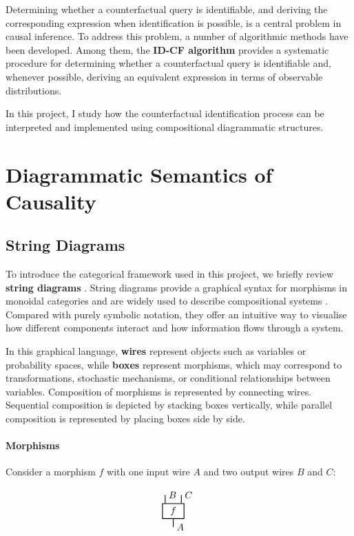\documentclass[a4paper]{report}
\begin{document}
Determining whether a counterfactual query is identifiable, and deriving the corresponding expression when identification is possible, is a central problem in causal inference. To address this problem, a number of algorithmic methods have been developed. Among them, the \textbf{ID-CF algorithm}\cite{shpitser2008complete} provides a systematic procedure for determining whether a counterfactual query is identifiable and, whenever possible, deriving an equivalent expression in terms of observable distributions.

In this project, I study how the counterfactual identification process can be interpreted and implemented using compositional diagrammatic structures.

\section{Diagrammatic Semantics of Causality}
\subsection{String Diagrams}
To introduce the categorical framework used in this project, we briefly review \textbf{string diagrams} \cite{intro_to_string_diagram}. String diagrams provide a graphical syntax for morphisms in monoidal categories and are widely used to describe compositional systems \cite{Selinger2011}. Compared with purely symbolic notation, they offer an intuitive way to visualise how different components interact and how information flows through a system.

In this graphical language, \textbf{wires} represent objects such as variables or 
probability spaces, while \textbf{boxes} represent morphisms, which may correspond 
to transformations, stochastic mechanisms, or conditional relationships between 
variables. Composition of morphisms is represented by connecting wires. 
Sequential composition is depicted by stacking boxes vertically, while parallel 
composition is represented by placing boxes side by side.

\paragraph{Morphisms}

Consider a morphism $f$ with one input wire $A$ and two output wires $B$ and $C$:

\[
\begin{tikzpicture}[thick, baseline=(box.base)]
\node[draw, minimum width=0.8cm, minimum height=0.5cm] (box) {$f$};
\draw (box.south) -- ++(0,-0.3) node[right] {$A$};
\draw (box.north) ++(-0.3,0) -- ++(0,0.3) node[right] {$B$};
\draw (box.north) ++(0.3,0) -- ++(0,0.3) node[right] {$C$};
\end{tikzpicture}
\]
\end{document}
